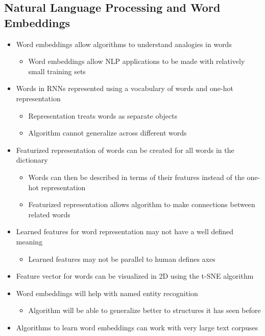 \documentclass[12pt, letterpaper]{article}
\begin{document}
    \subsection{Natural Language Processing and Word Embeddings}
    \begin{itemize}
        \item Word embeddings allow algorithms to understand analogies in words
        \begin{itemize}
            \item Word embeddings allow NLP applications to be made with relatively small training sets
        \end{itemize}
        \item Words in RNNs represented using a vocabulary of words and one-hot representation
        \begin{itemize}
            \item Representation treats words as separate objects
            \item Algorithm cannot generalize across different words
        \end{itemize}
        \item Featurized representation of words can be created for all words in the dictionary
        \begin{itemize}
            \item Words can then be described in terms of their features instead of the one-hot representation
            \item Featurized representation allows algorithm to make connections between related words 
        \end{itemize}
        \item Learned features for word representation may not have a well defined meaning
        \begin{itemize}
            \item Learned features may not be parallel to human defines axes
        \end{itemize}
        \item Feature vector for words can be visualized in 2D using the t-SNE algorithm
        \item Word embeddings will help with named entity recognition
        \begin{itemize}
            \item Algorithm will be able to generalize better to structures it has seen before 
        \end{itemize}
        \item Algorithms to learn word embeddings can work with very large text corpuses

\end{itemize}
\end{document}
